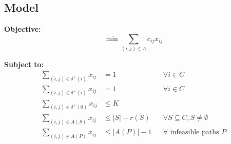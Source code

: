 \bigskip

\subsection*{Model}
\textbf{Objective:}
\begin{equation}
    \label{eq:objective}
    \min \sum_{(i,j)\in A} c_{ij}x_{ij}
\end{equation}

\textbf{Subject to:}
\begin{align}
    \sum_{(i,j)\in \delta^+(i)} x_{ij} & = 1                                                                                  &  & \forall i \in C                         \label{eq:flowout}     \\
    \sum_{(i,j)\in \delta^-(i)} x_{ij} & = 1                                                                                  &  & \forall i \in C                         \label{eq:flowin}      \\
    \sum_{(i,j)\in \delta^+(0)} x_{ij} & \leq K                                                       \label{eq:vehiclelimit}                                                                     \\
    \sum_{(i,j)\in A(S)} x_{ij}        & \leq |S| - r(S)                                                                      &  & \forall S \subseteq C, S \neq \emptyset \label{eq:capacitycut} \\
    \sum_{(i,j)\in A(P)} x_{ij}        & \leq |A(P)| - 1                                                                      &  & \forall \text{ infeasible paths } P     \label{eq:pathelim}
\end{align}

